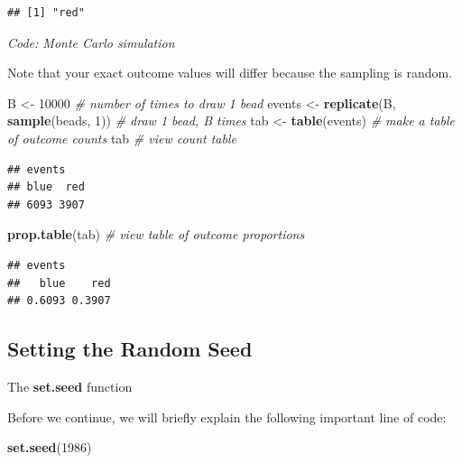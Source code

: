 \documentclass[
]{article}
\newenvironment{Shaded}{\begin{snugshade}}{\end{snugshade}}
\newcommand{\CommentTok}[1]{\textcolor[rgb]{0.56,0.35,0.01}{\textit{#1}}}
\newcommand{\DecValTok}[1]{\textcolor[rgb]{0.00,0.00,0.81}{#1}}
\newcommand{\KeywordTok}[1]{\textcolor[rgb]{0.13,0.29,0.53}{\textbf{#1}}}
\newcommand{\NormalTok}[1]{#1}
\newcommand{\StringTok}[1]{\textcolor[rgb]{0.31,0.60,0.02}{#1}}
\begin{document}
\begin{verbatim}
## [1] "red"
\end{verbatim}

\emph{Code: Monte Carlo simulation}

Note that your exact outcome values will differ because the sampling is
random.

\begin{Shaded}
\begin{Highlighting}[]
\NormalTok{B \textless{}{-}}\StringTok{ }\DecValTok{10000}    \CommentTok{\# number of times to draw 1 bead}
\NormalTok{events \textless{}{-}}\StringTok{ }\KeywordTok{replicate}\NormalTok{(B, }\KeywordTok{sample}\NormalTok{(beads, }\DecValTok{1}\NormalTok{))    }\CommentTok{\# draw 1 bead, B times}
\NormalTok{tab \textless{}{-}}\StringTok{ }\KeywordTok{table}\NormalTok{(events)    }\CommentTok{\# make a table of outcome counts}
\NormalTok{tab    }\CommentTok{\# view count table}
\end{Highlighting}
\end{Shaded}

\begin{verbatim}
## events
## blue  red 
## 6093 3907
\end{verbatim}

\begin{Shaded}
\begin{Highlighting}[]
\KeywordTok{prop.table}\NormalTok{(tab)    }\CommentTok{\# view table of outcome proportions}
\end{Highlighting}
\end{Shaded}

\begin{verbatim}
## events
##   blue    red 
## 0.6093 0.3907
\end{verbatim}

\hypertarget{setting-the-random-seed}{%
\subsection{Setting the Random Seed}\label{setting-the-random-seed}}

The \textbf{set.seed} function

Before we continue, we will briefly explain the following important line
of code:

\begin{Shaded}
\begin{Highlighting}[]
\KeywordTok{set.seed}\NormalTok{(}\DecValTok{1986}\NormalTok{)}
\end{Highlighting}
\end{Shaded}
\end{document}

